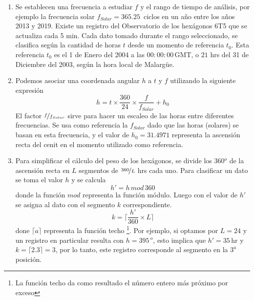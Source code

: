       \begin{enumerate}
        \item Se establecen una frecuencia a estudiar $f$ y el rango de tiempo de análisis, por ejemplo la frecuencia solar $f_{Solar}= 365.25\,$ ciclos en un año entre los años 2013 y 2019. Existe un registro del Observatorio de los hexágonos 6T5 que se actualiza cada 5 min. Cada dato tomado durante el rango seleccionado, se clasifica según la cantidad de horas $t$ desde un momento de referencia $t_0$. Esta referencia $t_0$ es el 1 de Enero del 2004 a las $00:00:00\,$GMT, o  $21$ hrs del 31 de Diciembre del 2003, según la hora local de Malargüe.

        \item Podemos asociar una coordenada angular $h$   a $t$  y $f$  utilizando la siguiente expresión
         \begin{equation}
          h = t \times \frac{360}{24} \times\frac{f}{f_{Solar}} + h_0
          \label{eq:h_horas} 
        \end{equation}
        El factor $\nicefrac{f}{f_{Solar}}$ sirve para hacer un escaleo de las horas entre diferentes frecuencias. Se usa como referencia la $f_{Solar}$ dado que las horas (solares) se basan en esta frecuencia, y el valor de $h_0=31.4971$ representa la ascensión recta del cenit en el momento utilizado como referencia.
        
        \item  Para simplificar el cálculo del peso de los hexágonos, se divide los 360$^o$ de la ascensión recta en $L$ segmentos de $\nicefrac{360}{L}$ hrs cada uno. Para clasificar un dato se  toma  el valor $h$  y se calcula
        \begin{equation}
          h' = h\, mod \,360 
          \label{eq:h_primado}
        \end{equation}
        donde la función $mod$ representa la función módulo. Luego con el valor de $h'$ se asigna al dato con el segmento $k$ correspondiente.
        \begin{equation}
          k = \bigg \lceil \frac{h'}{360}\times L \bigg \rceil
        \end{equation}
        done $\lceil a \rceil$ representa la función techo \footnote{La función techo da como resultado el número entero más próximo por exceso}. Por ejemplo, si optamos por $L=24$ y un registro en particular resulta con  $h=395\,^o$, esto implica que $h'= 35\,$hr y $k=\lceil 2.3 \rceil=3$, por lo tanto, este registro corresponde al segmento en la $3^{a}$ posición.


\end{enumerate}

